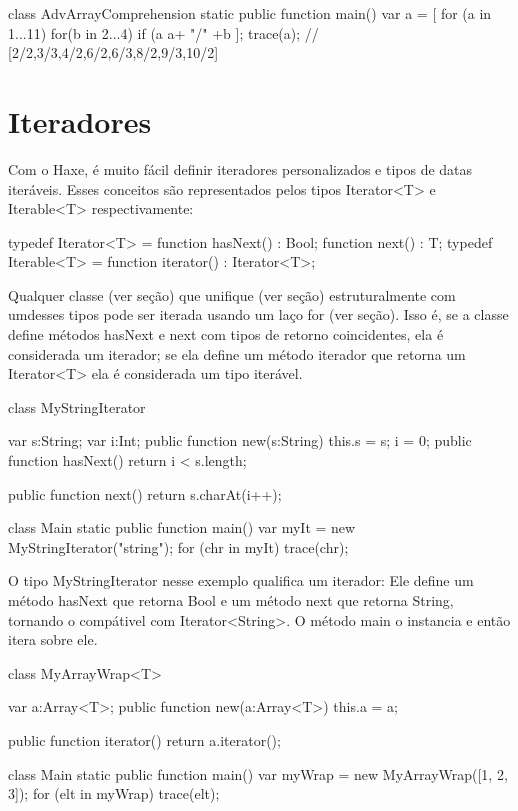 {class AdvArrayComprehension {
    static public function main() {
        var a = [
            for (a in 1...11)
                for(b in 2...4)
                    if (a %
                         a+ "/" +b
        ];
        trace(a); // [2/2,3/3,4/2,6/2,6/3,8/2,9/3,10/2]
    }    
}  

\section{Iteradores}

Com o Haxe, é muito fácil definir iteradores personalizados e tipos de datas iteráveis. Esses conceitos são representados pelos tipos Iterator<T> e Iterable<T> respectivamente:

typedef Iterator<T> = {
    function hasNext() : Bool;
    function next() : T;
}
typedef Iterable<T> = {
    function iterator() : Iterator<T>;
}

Qualquer classe (ver seção) que unifique (ver seção) estruturalmente com umdesses tipos pode ser iterada usando um laço for (ver seção). Isso é, se a classe define métodos hasNext e next com tipos de retorno coincidentes, ela é considerada um iterador; se ela define um método iterador que retorna um Iterator<T> ela é considerada um tipo iterável.

class MyStringIterator {
    var s:String;
    var i:Int;
    public function new(s:String) {
        this.s = s;
        i = 0;
    }
    public function hasNext() {
        return i < s.length;
    }

    public function next() {
        return s.charAt(i++);
    }
}

class Main {
    static public function main() {
        var myIt = new MyStringIterator("string");
        for (chr in myIt) {
            trace(chr);
        }
    }
}

O tipo MyStringIterator nesse exemplo qualifica um iterador: Ele define um método hasNext que retorna Bool e um método next que retorna String, tornando o compátivel com Iterator<String>. O método main o instancia e então itera sobre ele.

class MyArrayWrap<T> {
    var a:Array<T>;
    public function new(a:Array<T>) {
        this.a = a;
    }

    public function iterator() {
        return a.iterator();
    }
} 

class Main {
    static public function main() {
        var myWrap = new MyArrayWrap([1, 2, 3]);
        for (elt in myWrap) {
            trace(elt);
        }
    }  
}

}
